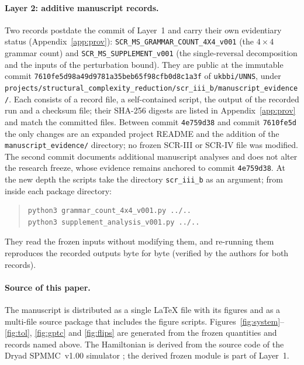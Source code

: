\documentclass[11pt,a4paper]{article}
\theoremstyle{plain}
\theoremstyle{definition}
\theoremstyle{remark}
\newcommand{\lean}[1]{\nolinkurl{#1}}
\begin{document}
\paragraph{Layer 2: additive manuscript records.} Two records postdate the commit of Layer~1 and carry their own evidentiary status (Appendix~\ref{app:prov}): \lean{SCR_MS_GRAMMAR_COUNT_4X4_v001} (the $4\times4$ grammar count) and \lean{SCR_MS_SUPPLEMENT_v001} (the single-reversal decomposition and the inputs of the perturbation bound). They are public at the immutable commit \texttt{7610fe5d98a49d9781a35beb65f98cfb0d8c1a3f} of \texttt{ukbbi/UNNS}, under \lean{projects/structural_complexity_reduction/scr_iii_b/manuscript_evidence/}. Each consists of a record file, a self-contained script, the output of the recorded run and a checksum file; their SHA-256 digests are listed in Appendix~\ref{app:prov} and match the committed files. Between commit \texttt{4e759d38} and commit \texttt{7610fe5d} the only changes are an expanded project README and the addition of the \lean{manuscript_evidence/} directory; no frozen SCR-III or SCR-IV file was modified. The second commit documents additional manuscript analyses and does not alter the research freeze, whose evidence remains anchored to commit \texttt{4e759d38}. At the new depth the scripts take the directory \lean{scr_iii_b} as an argument; from inside each package directory:
\begin{quote}\small
\begin{verbatim}
python3 grammar_count_4x4_v001.py ../..
python3 supplement_analysis_v001.py ../..
\end{verbatim}
\end{quote}
They read the frozen inputs without modifying them, and re-running them reproduces the recorded outputs byte for byte (verified by the authors for both records).

\paragraph{Source of this paper.} The manuscript is distributed as a single \LaTeX{} file with its figures and as a multi-file source package that includes the figure scripts. Figures~\ref{fig:system}--\ref{fig:tol}, \ref{fig:gptc} and \ref{fig:flips} are generated from the frozen quantities and records named above. The Hamiltonian is derived from the source code of the Dryad SPMMC~v1.00 simulator \cite{Hurben2026}; the derived frozen module is part of Layer~1.
\end{document}
